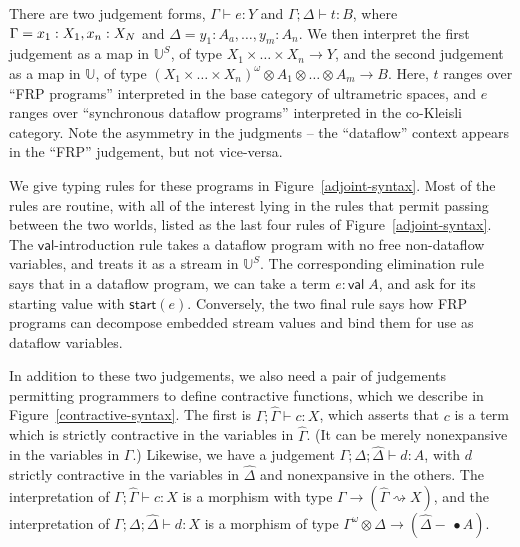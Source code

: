 \documentclass[nocopyrightspace,preprint]{sigplanconf}
\newcommand{\ultrametric}{\mathbb{U}}
\newcommand{\shrink}{\rightsquigarrow}
\newcommand{\Start}[1]{\mathsf{start}(#1)}
\newcommand{\lollishrink}{-\!\!\!\,\bullet}
\newcommand{\valtype}[1]{\mathsf{val}\;{#1}}
\newcommand{\judgeu}[3]{{#1} \vdash {#2} : {#3}}
\newcommand{\judgek}[4][\Gamma]{{#1};{#2} \vdash {#3} : {#4}}
\newcommand{\judgec}[4][\Gamma]{{#1};{#2} \vdash {#3} : {#4}}
\newcommand{\judgekc}[4][\Delta]{\Gamma;{#1};{#2} \vdash {#3} : {#4}}
\begin{document}
There are two judgement forms, $\judgeu{\Gamma}{e}{Y}$ and
$\judgek{\Delta}{t}{B}$, where $\Gamma = x_1:X_1,\label,x_n:X_N$ and
$\Delta = y_1:A_a, \ldots, y_m:A_n$.  We then interpret the first
judgement as a map in $\ultrametric^S$, of type $X_1 \times \ldots
\times X_n \to Y$, and the second judgement as a map in
$\ultrametric$, of type $(X_1 \times \ldots \times X_n)^\omega
\otimes A_1 \otimes \ldots \otimes A_m \to B$. Here, $t$ ranges over
``FRP programs'' interpreted in the base category of ultrametric
spaces, and $e$ ranges over ``synchronous dataflow programs''
interpreted in the co-Kleisli category. Note the asymmetry in 
the judgments -- the ``dataflow'' context appears in the ``FRP''
judgement, but not vice-versa. 

We give typing rules for these programs in
Figure~\ref{adjoint-syntax}.  Most of the rules are routine, with all
of the interest lying in the rules that permit passing between the two
worlds, listed as the last four rules of
Figure~\ref{adjoint-syntax}. The $\mathsf{val}$-introduction rule
takes a dataflow program with no free non-dataflow variables, and
treats it as a stream in $\ultrametric^S$. The corresponding elimination
rule says that in a dataflow program, we can take a term $e :
\valtype{A}$, and ask for its starting value with
$\Start{e}$. Conversely, the two final rule says how FRP programs
can decompose embedded stream values and bind them for use as 
dataflow variables.

In addition to these two judgements, we also need a pair of judgements
permitting programmers to define contractive functions, which we
describe in Figure~\ref{contractive-syntax}. The first is
$\judgec{\hat{\Gamma}}{c}{X}$, which asserts that $c$ is a term which
is strictly contractive in the variables in $\hat{\Gamma}$.  (It can
be merely nonexpansive in the variables in $\Gamma$.) Likewise, we
have a judgement $\judgekc{\hat{\Delta}}{d}{A}$, with $d$ 
strictly contractive in the variables in $\hat{\Delta}$ and
nonexpansive in the others. The interpretation of
$\judgec{\hat{\Gamma}}{c}{X}$ is a morphism with type $\Gamma \to
(\hat{\Gamma} \shrink X)$, and the interpretation of
$\judgekc{\hat{\Delta}}{d}{X}$ is a morphism of type $\Gamma^\omega
\otimes \Delta \to (\hat{\Delta} \lollishrink A)$.  
\end{document}
